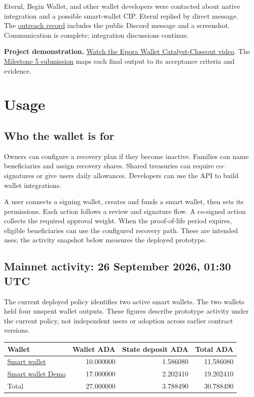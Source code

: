 \documentclass[fontsize=10pt,paper=a4,DIV=16,parskip=half-]{scrartcl}
\newcommand{\repo}[2]{\href{https://github.com/schaier-io/epora-wallet/blob/main/#1}{#2}}
\newcommand{\hd}[1]{{\sffamily\bfseries\color{brandnavy}#1}}
\begin{document}
Eternl, Begin Wallet, and other wallet developers were contacted about native integration and a possible smart-wallet CIP. Eternl replied by direct message. The \repo{docs/wallet-integration.md}{outreach record} includes the public Discord message and a screenshot. Communication is complete; integration discussions continue.

\textbf{Project demonstration.} \href{https://youtu.be/XKyZoa02kag}{Watch the Epora Wallet Catalyst-Closeout video}. The \repo{docs/closeout/milestone-5-submission.txt}{Milestone 5 submission} maps each final output to its acceptance criteria and evidence.

\newpage
\section{Usage}

\subsection*{Who the wallet is for}
Owners can configure a recovery plan if they become inactive. Families can name beneficiaries and assign recovery shares. Shared treasuries can require co-signatures or give users daily allowances. Developers can use the API to build wallet integrations.

A user connects a signing wallet, creates and funds a smart wallet, then sets its permissions. Each action follows a review and signature flow. A co-signed action collects the required approval weight. When the proof-of-life period expires, eligible beneficiaries can use the configured recovery path. These are intended uses; the activity snapshot below measures the deployed prototype.

\subsection*{Mainnet activity: 26 September 2026, 01:30 UTC} The current deployed policy identifies two active smart wallets. The two wallets held four unspent wallet outputs. These figures describe prototype activity under the current policy, not independent users or adoption across earlier contract versions.

\begin{tabularx}{\linewidth}{@{}Xrrr@{}}
\toprule
\hd{Wallet} & \hd{Wallet ADA} & \hd{State deposit ADA} & \hd{Total ADA} \\
\midrule
\href{https://cardanoscan.io/address/addr1wynmfgsec4hax5e29fretxg0c0ve6xznpcry04087g7jg8skrul80}{Smart wallet} & 10.000000 & 1.586080 & 11.586080 \\
\href{https://cardanoscan.io/address/addr1w8wj6tjlfqjdgtlxq9t6g4ar089e7vs6wcqwpwpxgdtqvysply755}{Smart wallet Demo} & 17.000000 & 2.202410 & 19.202410 \\
\midrule
Total & 27.000000 & 3.788490 & 30.788490 \\
\bottomrule
\end{tabularx}
\end{document}
